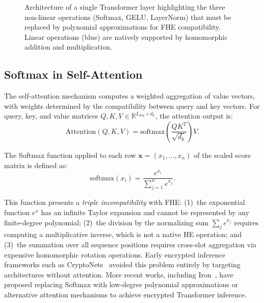\begin{figure}[htbp]
\caption{Architecture of a single Transformer layer highlighting the three non-linear operations (Softmax, GELU, LayerNorm) that must be replaced by polynomial approximations for FHE compatibility. Linear operations (blue) are natively supported by homomorphic addition and multiplication.}
\label{fig:transformer_block}
\end{figure}

\subsection{Softmax in Self-Attention}

The self-attention mechanism computes a weighted aggregation of value vectors, with weights determined by the compatibility between query and key vectors. For query, key, and value matrices $Q, K, V \in \mathbb{R}^{L_{\text{seq}} \times d_k}$, the attention output is:
\begin{equation}
    \mathrm{Attention}(Q, K, V) = \mathrm{softmax}\!\left(\frac{QK^T}{\sqrt{d_k}}\right) V.
    \label{eq:attention}
\end{equation}

The Softmax function applied to each row $\mathbf{x} = (x_1, \ldots, x_n)$ of the scaled score matrix is defined as:
\begin{equation}
    \mathrm{softmax}(x_i) = \frac{e^{x_i}}{\sum_{j=1}^{n} e^{x_j}}.
    \label{eq:softmax}
\end{equation}

This function presents a \emph{triple incompatibility} with FHE: (1)~the exponential function $e^{x}$ has an infinite Taylor expansion and cannot be represented by any finite-degree polynomial; (2)~the division by the normalizing sum $\sum_j e^{x_j}$ requires computing a multiplicative inverse, which is not a native HE operation; and (3)~the summation over all sequence positions requires cross-slot aggregation via expensive homomorphic rotation operations. Early encrypted inference frameworks such as CryptoNets~\cite{gilad2016cryptonets} avoided this problem entirely by targeting architectures without attention. More recent works, including Iron~\cite{hao2022iron}, have proposed replacing Softmax with low-degree polynomial approximations or alternative attention mechanisms to achieve encrypted Transformer inference.

